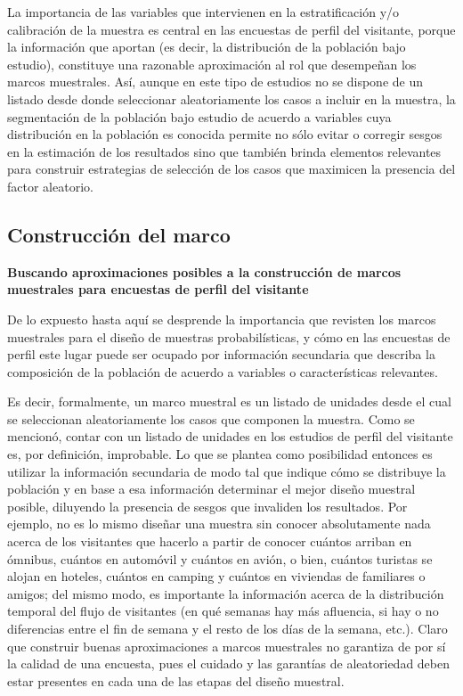 \documentclass[
]{book}
\begin{document}
La importancia de las variables que intervienen en la estratificación y/o calibración de la muestra es central en las encuestas de perfil del visitante, porque la información que aportan (es decir, la distribución de la población bajo estudio), constituye una razonable aproximación al rol que desempeñan los marcos muestrales. Así, aunque en este tipo de estudios no se dispone de un listado desde donde seleccionar aleatoriamente los casos a incluir en la muestra, la segmentación de la población bajo estudio de acuerdo a variables cuya distribución en la población es conocida permite no sólo evitar o corregir sesgos en la estimación de los resultados sino que también brinda elementos relevantes para construir estrategias de selección de los casos que maximicen la presencia del factor aleatorio.

\hypertarget{construcciuxf3n-del-marco}{%
\subsection{Construcción del marco}\label{construcciuxf3n-del-marco}}

\textbf{Buscando aproximaciones posibles a la construcción de marcos muestrales para encuestas de perfil del visitante}

De lo expuesto hasta aquí se desprende la importancia que revisten los marcos muestrales para el diseño de muestras probabilísticas, y cómo en las encuestas de perfil este lugar puede ser ocupado por información secundaria que describa la composición de la población de acuerdo a variables o características relevantes.

Es decir, formalmente, un marco muestral es un listado de unidades desde el cual se seleccionan aleatoriamente los casos que componen la muestra. Como se mencionó, contar con un listado de unidades en los estudios de perfil del visitante es, por definición, improbable. Lo que se plantea como posibilidad entonces es utilizar la información secundaria de modo tal que indique cómo se distribuye la población y en base a esa información determinar el mejor diseño muestral posible, diluyendo la presencia de sesgos que invaliden los resultados. Por ejemplo, no es lo mismo diseñar una muestra sin conocer absolutamente nada acerca de los visitantes que hacerlo a partir de conocer cuántos arriban en ómnibus, cuántos en automóvil y cuántos en avión, o bien, cuántos turistas se alojan en hoteles, cuántos en camping y cuántos en viviendas de familiares o amigos; del mismo modo, es importante la información acerca de la distribución temporal del flujo de visitantes (en qué semanas hay más afluencia, si hay o no diferencias entre el fin de semana y el resto de los días de la semana, etc.). Claro que construir buenas aproximaciones a marcos muestrales no garantiza de por sí la calidad de una encuesta, pues el cuidado y las garantías de aleatoriedad deben estar presentes en cada una de las etapas del diseño muestral.
\end{document}
